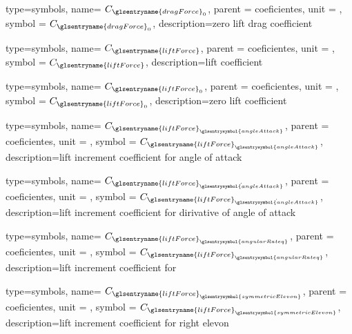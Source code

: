 {type=symbols,
    name= \ensuremath{C_{{\glsentryname{dragForce}}_{0}}},
    parent = {coeficientes},
    unit = \unexpanded{},
    symbol = \ensuremath{C_{{\glsentryname{dragForce}}_{0}}},
    description={zero lift drag coefficient}
}

{type=symbols,
    name= \ensuremath{C_{\glsentryname{liftForce}}},
    parent = {coeficientes},
    unit = \unexpanded{},
    symbol = \ensuremath{C_{\glsentryname{liftForce}}},
    description={lift coefficient}
}

{type=symbols,
    name= \ensuremath{C_{\glsentryname{liftForce}_{0}}},
    parent = {coeficientes},
    unit = \unexpanded{},
    symbol = \ensuremath{C_{\glsentryname{liftForce}_{0}}},
    description={zero lift coefficient}
}

{type=symbols,
    name= \ensuremath{C_{{\glsentryname{liftForce}}_{\glsentrysymbol{angleAttack}}}},
    parent = {coeficientes},
    unit = \unexpanded{},
    symbol = \ensuremath{C_{{\glsentryname{liftForce}}_{\glsentrysymbol{angleAttack}}}},
    description={lift increment coefficient for angle of attack}
}

{type=symbols,
    name= \ensuremath{C_{{\glsentryname{liftForce}}_{\dot{\glsentrysymbol{angleAttack}}}}},
    parent = {coeficientes},
    unit = \unexpanded{},
    symbol = \ensuremath{C_{{\glsentryname{liftForce}}_{\dot{\glsentrysymbol{angleAttack}}}}},
    description={lift increment coefficient for dirivative of angle of attack}
}

{type=symbols,
    name= \ensuremath{C_{{\glsentryname{liftForce}}_{\glsentrysymbol{angularRateq}}}},
    parent = {coeficientes},
    unit = \unexpanded{},
    symbol = \ensuremath{C_{{\glsentryname{liftForce}}_{\glsentrysymbol{angularRateq}}}},
    description={lift increment coefficient for }
}

{type=symbols,
    name= \ensuremath{C_{{\glsentryname{liftForce}}_{\glsentrysymbol{symmetricElevon}}}},
    parent = {coeficientes},
    unit = \unexpanded{},
    symbol = \ensuremath{C_{{\glsentryname{liftForce}}_{\glsentrysymbol{symmetricElevon}}}},
    description={lift increment coefficient for right elevon}
}

